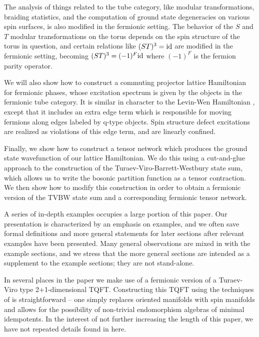The analysis of things related to the tube category, 
like modular transformations, braiding statistics, and the computation of ground state degeneracies on various spin surfaces,
is also modified in the fermionic setting.  
The behavior of the $S$ and $T$ modular transformations on the torus depends on the spin structure of the torus in question, and 
certain relations like $(ST)^3 = \text{id}$ are modified in the fermionic setting, becoming 
$(ST)^3=(-1)^F\text{id}$ where $(-1)^F$ is the fermion parity operator.

We will also show how to construct a commuting projector lattice Hamiltonian 
for fermionic phases, whose excitation spectrum is given by the objects in the fermionic tube category.  
It is similar in character to the Levin-Wen Hamiltonian \cite{levin2005}, 
except that it includes an extra edge term which is responsible for moving fermions along
edges labeled by q-type objects. 
Spin structure defect excitations 
are realized as violations of this edge term, and are linearly confined. 

Finally, we show how to construct a tensor network which produces the ground state 
wavefunction of our lattice Hamiltonian. We do this using a cut-and-glue approach to 
the construction of the Turaev-Viro-Barrett-Westbury state sum, which allows us to write the bosonic partition function
as a tensor contraction. 
We then show how to modify this construction in order to obtain a fermionic version of the TVBW state sum
and a corresponding fermionic tensor network.  

A series of in-depth examples occupies a large portion of this paper.
Our presentation is characterized by an emphasis on examples, 
and we often save formal definitions and more general statements 
for later sections after relevant examples have been presented.  
Many general observations are mixed in with the example sections,
and we stress that the more general sections are intended as a supplement
to the example sections; they are not stand-alone.

In several places in the paper we make use of a fermionic version of a Turaev-Viro type 2+1-dimensional TQFT.
Constructing this TQFT using the techniques of \cite{Walker2006} is straightforward -- one simply replaces oriented manifolds with
spin manifolds and allows for the possibility of non-trivial endomorphism algebras of minimal idempotents.
In the interest of not further increasing the length of this paper, we have not repeated details found in
\cite{Walker2006} here.

